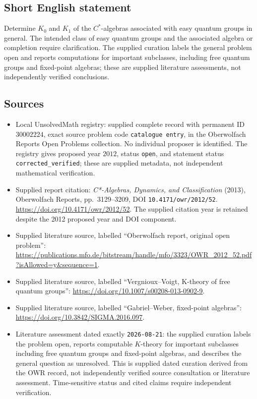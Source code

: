 \documentclass[11pt]{article}
\begin{document}
\subsection{Short English statement}
Determine \(K_0\) and \(K_1\) of the \(C^*\)-algebras associated with easy quantum groups in general. The intended class of easy quantum groups and the associated algebra or completion require clarification. The supplied curation labels the general problem open and reports computations for important subclasses, including free quantum groups and fixed-point algebras; these are supplied literature assessments, not independently verified conclusions.
\subsection{Sources}
\begin{itemize}
\item Local UnsolvedMath registry: supplied complete record with permanent ID \(30002224\), exact source problem code \texttt{catalogue entry}, in the Oberwolfach Reports Open Problems collection. No individual proposer is identified. The registry gives proposed year \(2012\), status \texttt{open}, and statement status \texttt{corrected\_verified}; these are supplied metadata, not independent mathematical verification.
\item Supplied report citation: \emph{C*-Algebras, Dynamics, and Classification} (2013), Oberwolfach Reports, pp.\ 3129--3209, DOI \texttt{10.4171/owr/2012/52}. \url{https://doi.org/10.4171/owr/2012/52}. The supplied citation year is retained despite the 2012 proposed year and DOI component.
\item Supplied literature source, labelled ``Oberwolfach report, original open problem'': \url{https://publications.mfo.de/bitstream/handle/mfo/3323/OWR_2012_52.pdf?isAllowed=y&sequence=1}.
\item Supplied literature source, labelled ``Vergnioux--Voigt, K-theory of free quantum groups'': \url{https://doi.org/10.1007/s00208-013-0902-9}.
\item Supplied literature source, labelled ``Gabriel--Weber, fixed-point algebras'': \url{https://doi.org/10.3842/SIGMA.2016.097}.
\item Literature assessment dated exactly \texttt{2026-08-21}: the supplied curation labels the problem open, reports computable \(K\)-theory for important subclasses including free quantum groups and fixed-point algebras, and describes the general question as unresolved. This is supplied dated curation derived from the OWR record, not independently verified source consultation or literature assessment. Time-sensitive status and cited claims require independent verification.
\end{itemize}
\end{document}
